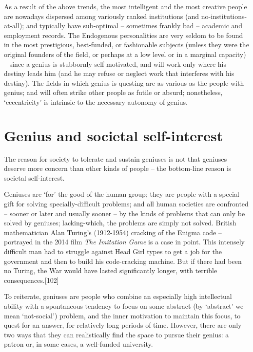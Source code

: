 \documentclass[
]{book}
\begin{document}
As a result of the above trends, the most intelligent and the most creative people are nowadays dispersed among variously ranked institutions (and no-institutions-at-all); and typically have sub-optimal -- sometimes frankly bad -- academic and employment records. The Endogenous personalities are very seldom to be found in the most prestigious, best-funded, or fashionable subjects (unless they were the original founders of the field, or perhaps at a low level or in a marginal capacity) -- since a genius is stubbornly self-motivated, and will work only where his destiny leads him (and he may refuse or neglect work that interferes with his destiny). The fields in which genius is questing are as various as the people with genius; and will often strike other people as futile or absurd; nonetheless, `eccentricity' is intrinsic to the necessary autonomy of genius.

\hypertarget{genius-and-societal-self-interest}{%
\section{Genius and societal self-interest}\label{genius-and-societal-self-interest}}

The reason for society to tolerate and sustain geniuses is not that geniuses deserve more concern than other kinds of people -- the bottom-line reason is societal self-interest.

Geniuses are `for' the good of the human group; they are people with a special gift for solving specially-difficult problems; and all human societies are confronted -- sooner or later and usually sooner -- by the kinds of problems that can only be solved by geniuses; lacking-which, the problems are simply not solved. British mathematician Alan Turing's (1912-1954) cracking of the Enigma code -- portrayed in the 2014 film \emph{The Imitation Game} is a case in point. This intensely difficult man had to struggle against Head Girl types to get a job for the government and then to build his code-cracking machine. But if there had been no Turing, the War would have lasted significantly longer, with terrible consequences.{[}102{]}

To reiterate, geniuses are people who combine an especially high intellectual ability with a spontaneous tendency to focus on some abstract (by `abstract' we mean `not-social') problem, and the inner motivation to maintain this focus, to quest for an answer, for relatively long periods of time. However, there are only two ways that they can realistically find the space to pursue their genius: a patron or, in some cases, a well-funded university.
\end{document}
